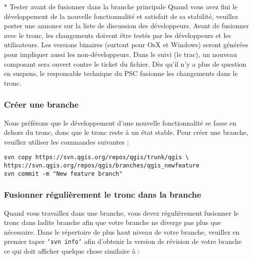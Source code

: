  * Tester avant de fusionner dans la branche principale
Quand vous avez fini le d\'eveloppement de la nouvelle fonctionnalit\'e et satisfait de sa stabilit\'e, veuillez poster une annonce sur la liste de discussion des d\'eveloppeurs. Avant de fusionner avec le tronc, les changements doivent \^etre test\'es par les d\'eveloppeurs et les utilisateurs. Les versions binaires (surtout pour OsX et Windows) seront g\'en\'er\'ees pour impliquer aussi les non-d\'eveloppeurs. Dans le suivi (le trac), un nouveau composant sera ouvert contre le ticket du fichier. D\`es qu'il n'y a plus de question en suspens, le responsable technique du PSC fusionne les changements dans le tronc.

\subsubsection{Cr\'eer une branche}
Nous pr\'ef\'erons que le d\'eveloppement d'une nouvelle fonctionnalit\'e se fasse en dehors du tronc, donc que le tronc reste \`a un \'etat stable. Pour cr\'eer une branche, veuillez utiliser les commandes suivantes :
\begin{verbatim}
svn copy https://svn.qgis.org/repos/qgis/trunk/qgis \
https://svn.qgis.org/repos/qgis/branches/qgis_newfeature
svn commit -m "New feature branch"
\end{verbatim}


\subsubsection{Fusionner r\'eguli\`erement le tronc dans la branche}
Quand vous travaillez dans une branche, vous devez r\'eguli\`erement fusionner le tronc dans ladite branche afin que votre branche ne diverge pas plus que n\'ecessaire. Dans le r\'epertoire de plus haut niveau de votre branche, veuillez en premier taper \texttt{`svn info`} afin d'obtenir la version de r\'evision de votre branche ce qui doit afficher quelque chose similaire \`a :

